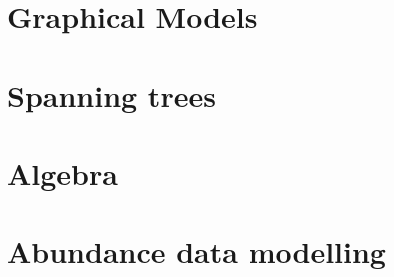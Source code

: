 \section{Graphical Models}
\section{Spanning trees}
\section{Algebra}
\section{Abundance data modelling}